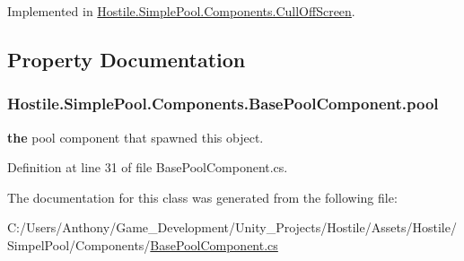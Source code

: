 Implemented in \hyperlink{class_hostile_1_1_simple_pool_1_1_components_1_1_cull_off_screen_a6f8f2a33c8f0d28f109de1deb85dc2c5}{Hostile.\-Simple\-Pool.\-Components.\-Cull\-Off\-Screen}.



\subsection{Property Documentation}
\hypertarget{class_hostile_1_1_simple_pool_1_1_components_1_1_base_pool_component_ac2a2a4f41f20b50d8f3c2ea545461c72}{
\subsubsection[{pool}]{ Hostile.\-Simple\-Pool.\-Components.\-Base\-Pool\-Component.\-pool\hspace{0.3cm}{\ttfamily [get]}}}\label{class_hostile_1_1_simple_pool_1_1_components_1_1_base_pool_component_ac2a2a4f41f20b50d8f3c2ea545461c72}
{\bfseries the} pool component that spawned this object. 

Definition at line 31 of file Base\-Pool\-Component.\-cs.



The documentation for this class was generated from the following file\-:\begin{DoxyCompactItemize}
\item 
C\-:/\-Users/\-Anthony/\-Game\-\_\-\-Development/\-Unity\-\_\-\-Projects/\-Hostile/\-Assets/\-Hostile/\-Simpel\-Pool/\-Components/\hyperlink{_base_pool_component_8cs}{Base\-Pool\-Component.\-cs}\end{DoxyCompactItemize}
